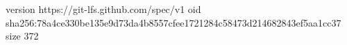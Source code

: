 version https://git-lfs.github.com/spec/v1
oid sha256:78a4ce330be135e9d73da4b8557cfee1721284c58473d214682843ef5aa1cc37
size 372
